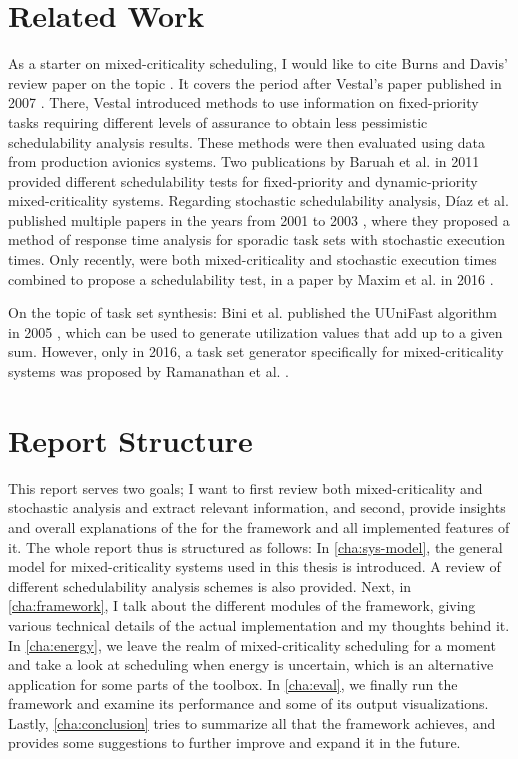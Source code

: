 \documentclass[a4paper,oneside]{csthesis}
\begin{document}
\section{Related Work}
As a starter on mixed-criticality scheduling, I would like to cite Burns and Davis' review paper on the topic \cite{burns2013mixed}. It covers the period after Vestal's paper published in 2007 \cite{vestal2007preemptive}. There, Vestal introduced methods to use information on fixed-priority tasks requiring different levels of assurance to obtain less pessimistic schedulability analysis results. These methods were then evaluated using data from production avionics systems. Two publications by Baruah et al. in 2011 provided different schedulability tests for fixed-priority \cite{baruah2011response} and dynamic-priority \cite{baruah2011mixed} mixed-criticality systems. Regarding stochastic schedulability analysis, Díaz et al. published multiple papers in the years from 2001 to 2003 \cite{diaz2002stochastic, diaz2002probabilistic, diaz2003stochastic}, where they proposed a method of response time analysis for sporadic task sets with stochastic execution times. Only recently, were both mixed-criticality and stochastic execution times combined to propose a schedulability test, in a paper by Maxim et al. in 2016 \cite{maxim2016probabilistic}. 

On the topic of task set synthesis: Bini et al. published the UUniFast algorithm in 2005 \cite{bini2005measuring}, which can be used to generate utilization values that add up to a given sum. However, only in 2016, a task set generator specifically for mixed-criticality systems was proposed by Ramanathan et al. \cite{ramanathan2016evaluation}.

\section{Report Structure}
This report serves two goals; I want to first review both mixed-criticality and stochastic analysis and extract relevant information, and second, provide insights and overall explanations of the for the framework and all implemented features of it. The whole report thus is structured as follows: In \cref{cha:sys-model}, the general model for mixed-criticality systems used in this thesis is introduced. A review of different schedulability analysis schemes is also provided. Next, in \cref{cha:framework}, I talk about the different modules of the framework, giving various technical details of the actual implementation and my thoughts behind it. In \cref{cha:energy}, we leave the realm of mixed-criticality scheduling for a moment and take a look at scheduling when energy is uncertain, which is an alternative application for some parts of the toolbox. In \cref{cha:eval}, we finally run the framework and examine its performance and some of its output visualizations. Lastly, \cref{cha:conclusion} tries to summarize all that the framework achieves, and provides some suggestions to further improve and expand it in the future.
\end{document}
